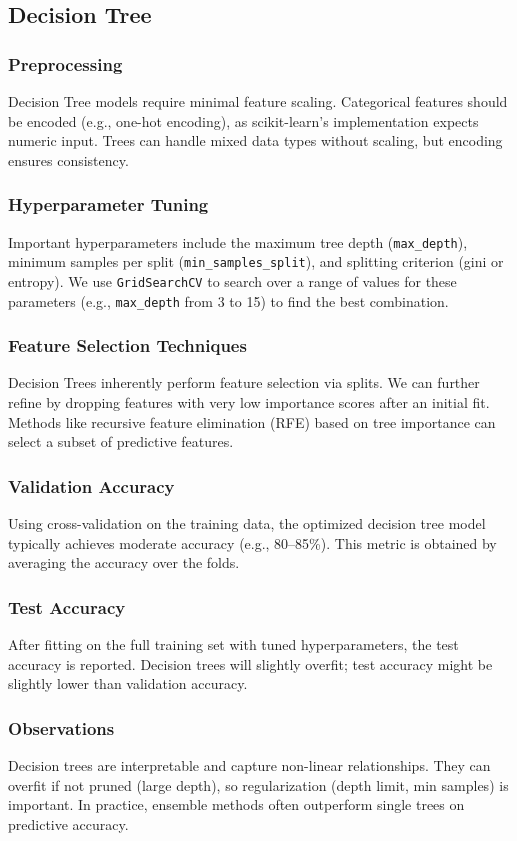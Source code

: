 \documentclass[12pt]{article}
\begin{document}
\subsection{Decision Tree}
\subsubsection{Preprocessing}
Decision Tree models require minimal feature scaling. Categorical features should be encoded (e.g., one-hot encoding), as scikit-learn's implementation expects numeric input. Trees can handle mixed data types without scaling, but encoding ensures consistency.
\subsubsection{Hyperparameter Tuning}
Important hyperparameters include the maximum tree depth (\texttt{max\_depth}), minimum samples per split (\texttt{min\_samples\_split}), and splitting criterion (gini or entropy). We use \texttt{GridSearchCV} to search over a range of values for these parameters (e.g., \texttt{max\_depth} from 3 to 15) to find the best combination.
\subsubsection{Feature Selection Techniques}
Decision Trees inherently perform feature selection via splits. We can further refine by dropping features with very low importance scores after an initial fit. Methods like recursive feature elimination (RFE) based on tree importance can select a subset of predictive features.
\subsubsection{Validation Accuracy}
Using cross-validation on the training data, the optimized decision tree model typically achieves moderate accuracy (e.g., 80--85\%). This metric is obtained by averaging the accuracy over the folds.
\subsubsection{Test Accuracy}
After fitting on the full training set with tuned hyperparameters, the test accuracy is reported. Decision trees will slightly overfit; test accuracy might be slightly lower than validation accuracy.
\subsubsection{Observations}
Decision trees are interpretable and capture non-linear relationships. They can overfit if not pruned (large depth), so regularization (depth limit, min samples) is important. In practice, ensemble methods often outperform single trees on predictive accuracy.
\end{document}
